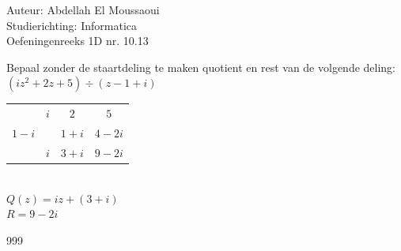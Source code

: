 \documentclass[a4paper]{article}
\begin{document}
  
\noindent \large Auteur: Abdellah El Moussaoui \\
\noindent \large Studierichting: Informatica\\
\noindent \large Oefeningenreeks 1D nr. 10.13\\

\medskip

\normalsize

Bepaal zonder de staartdeling te maken quotient en rest van de volgende deling: \\

$(iz^2+2z+5) \div (z-1+i)$\\

\begin{tabular}{c|cc|c} 
& $i$ & $2$ & $5$\\ 
$1-i$ & & $1+i$ & $4-2i$\\ \hline 
& $i$ & $3+i$ & $9-2i$ 
\end{tabular}\\

$Q(z) = iz+(3+i)$\\

$R = 9-2i$\\

\begin{thebibliography}{999}
\end{thebibliography}
\end{document}

